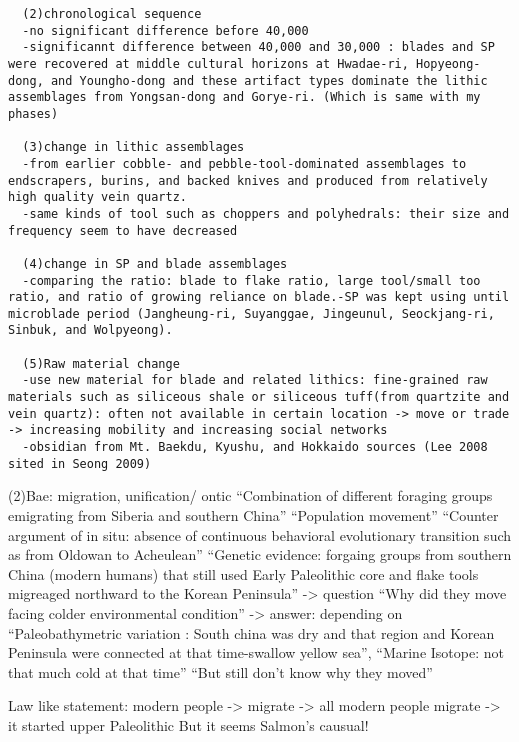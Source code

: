 \documentclass[american,man]{apa6}
\begin{document}
\begin{verbatim}
  (2)chronological sequence
  -no significant difference before 40,000
  -significannt difference between 40,000 and 30,000 : blades and SP were recovered at middle cultural horizons at Hwadae-ri, Hopyeong-dong, and Youngho-dong and these artifact types dominate the lithic assemblages from Yongsan-dong and Gorye-ri. (Which is same with my phases)
  
  (3)change in lithic assemblages
  -from earlier cobble- and pebble-tool-dominated assemblages to endscrapers, burins, and backed knives and produced from relatively high quality vein quartz. 
  -same kinds of tool such as choppers and polyhedrals: their size and frequency seem to have decreased
  
  (4)change in SP and blade assemblages
  -comparing the ratio: blade to flake ratio, large tool/small too ratio, and ratio of growing reliance on blade.-SP was kept using until microblade period (Jangheung-ri, Suyanggae, Jingeunul, Seockjang-ri, Sinbuk, and Wolpyeong).
  
  (5)Raw material change
  -use new material for blade and related lithics: fine-grained raw materials such as siliceous shale or siliceous tuff(from quartzite and vein quartz): often not available in certain location -> move or trade -> increasing mobility and increasing social networks
  -obsidian from Mt. Baekdu, Kyushu, and Hokkaido sources (Lee 2008 sited in Seong 2009)
\end{verbatim}

(2)Bae: migration, unification/ ontic \enquote{Combination of different
foraging groups emigrating from Siberia and southern China}
\enquote{Population movement} \enquote{Counter argument of in situ:
absence of continuous behavioral evolutionary transition such as from
Oldowan to Acheulean} \enquote{Genetic evidence: forgaing groups from
southern China (modern humans) that still used Early Paleolithic core
and flake tools migreaged northward to the Korean Peninsula}
-\textgreater{} question \enquote{Why did they move facing colder
environmental condition} -\textgreater{} answer: depending on
\enquote{Paleobathymetric variation : South china was dry and that
region and Korean Peninsula were connected at that time-swallow yellow
sea}, \enquote{Marine Isotope: not that much cold at that time}
\enquote{But still don't know why they moved}

Law like statement: modern people -\textgreater{} migrate
-\textgreater{} all modern people migrate -\textgreater{} it started
upper Paleolithic But it seems Salmon's causual!
\end{document}
